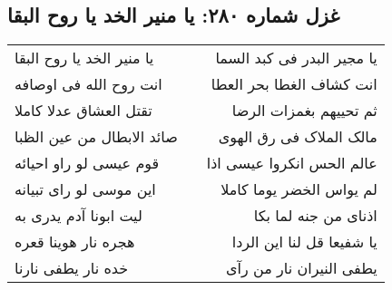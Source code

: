 \begin{center}
\section*{غزل شماره ۲۸۰: یا منیر الخد یا روح البقا}
\label{sec:0280}
\begin{longtable}{l p{0.5cm} r}
یا منیر الخد یا روح البقا
&&
یا مجیر البدر فی کبد السما
\\
انت روح الله فی اوصافه
&&
انت کشاف الغطا بحر العطا
\\
تقتل العشاق عدلا کاملا
&&
ثم تحییهم بغمزات الرضا
\\
صائد الابطال من عین الظبا
&&
مالک الملاک فی رق الهوی
\\
قوم عیسی لو راو احیائه
&&
عالم الحس انکروا عیسی اذا
\\
این موسی لو رای تبیانه
&&
لم یواس الخضر یوما کاملا
\\
لیت ابونا آدم یدری به
&&
اذنای من جنه لما بکا
\\
هجره نار هوینا قعره
&&
یا شفیعا قل لنا این الردا
\\
خده نار یطفی نارنا
&&
یطفی النیران نار من رآی
\\
\end{longtable}
\end{center}
